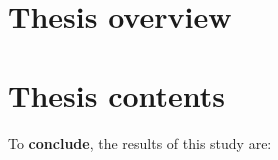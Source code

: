 
\section*{Thesis overview}



\section*{Thesis contents}

To \textbf{conclude}, the results of this study are:

